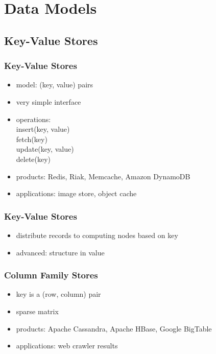 \documentclass[dvipsnames]{beamer}
\theoremstyle{plain}
\begin{document}
\section{Data Models}

\subsection{Key-Value Stores}

\begin{frame}
  \frametitle{Key-Value Stores}

  \begin{itemize}
    \item model: (key, value) pairs
    \item very simple interface
    \item operations:\\
      insert(key, value)\\
      fetch(key)\\
      update(key, value)\\
      delete(key)
    \item products: Redis, Riak, Memcache, Amazon DynamoDB
    \item applications: image store, object cache
  \end{itemize}
\end{frame}

\begin{frame}
  \frametitle{Key-Value Stores}

  \begin{itemize}
    \item distribute records to computing nodes based on key
    \item advanced: structure in value
  \end{itemize}
\end{frame}

\begin{frame}
  \frametitle{Column Family Stores}

  \begin{itemize}
    \item key is a (row, column) pair
    \item sparse matrix
    \item products: Apache Cassandra, Apache HBase, Google BigTable
    \item applications: web crawler results
  \end{itemize}
\end{frame}
\end{document}
